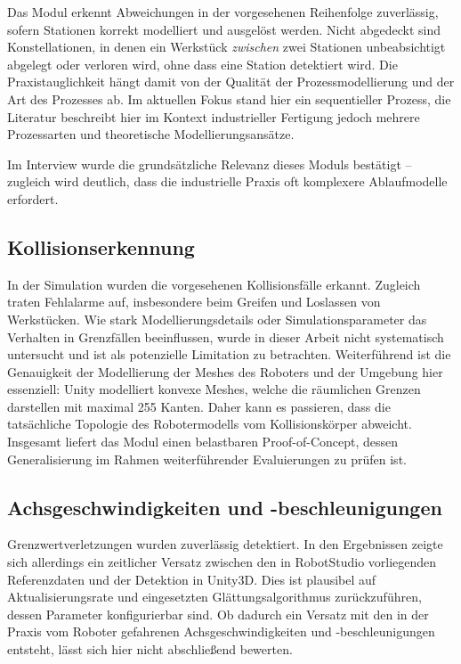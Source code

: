 Das Modul erkennt Abweichungen in der vorgesehenen Reihenfolge zuverlässig,
sofern Stationen korrekt modelliert und ausgelöst werden. Nicht abgedeckt sind
Konstellationen, in denen ein Werkstück \emph{zwischen} zwei Stationen
unbeabsichtigt abgelegt oder verloren wird, ohne dass eine Station detektiert
wird. Die Praxistauglichkeit hängt damit von der Qualität der
Prozessmodellierung und der Art des Prozesses ab. Im aktuellen Fokus stand hier
ein sequentieller Prozess, die Literatur beschreibt hier im Kontext
industrieller Fertigung jedoch mehrere Prozessarten und theoretische
Modellierungsansätze.{ Im Interview
  wurde die grundsätzliche Relevanz dieses
  Moduls bestätigt – zugleich wird deutlich, dass die industrielle Praxis oft
  komplexere Ablaufmodelle erfordert.

  \subsection{Kollisionserkennung}

  In der Simulation wurden die vorgesehenen Kollisionsfälle erkannt. Zugleich
  traten Fehlalarme auf, insbesondere beim Greifen und Loslassen von
  Werkstücken. Wie stark Modellierungsdetails oder
  Simulationsparameter das Verhalten in Grenzfällen beeinflussen,
  wurde in dieser Arbeit nicht systematisch untersucht
  und ist als potenzielle Limitation zu betrachten. Weiterführend ist die
  Genauigkeit der Modellierung der Meshes des Roboters und der Umgebung hier
  essenziell: Unity modelliert konvexe Meshes, welche die räumlichen Grenzen
  darstellen mit maximal 255 Kanten. Daher kann es passieren, dass die
  tatsächliche Topologie des Robotermodells vom Kollisionskörper abweicht.
  Insgesamt liefert das Modul einen belastbaren Proof-of-Concept, dessen
  Generalisierung im Rahmen weiterführender Evaluierungen zu prüfen ist.

  \subsection{Achsgeschwindigkeiten und -beschleunigungen}

  Grenzwertverletzungen wurden zuverlässig detektiert. In den Ergebnissen zeigte
  sich allerdings ein zeitlicher Versatz zwischen den in RobotStudio
  vorliegenden
  Referenzdaten und der Detektion in Unity3D. Dies ist plausibel auf
  Aktualisierungsrate und eingesetzten Glättungsalgorithmus
  zurückzuführen, dessen
  Parameter konfigurierbar sind. Ob dadurch ein Versatz mit den in der Praxis
  vom Roboter gefahrenen Achsgeschwindigkeiten und -beschleunigungen
  entsteht, lässt sich hier
  nicht abschließend bewerten.

}
